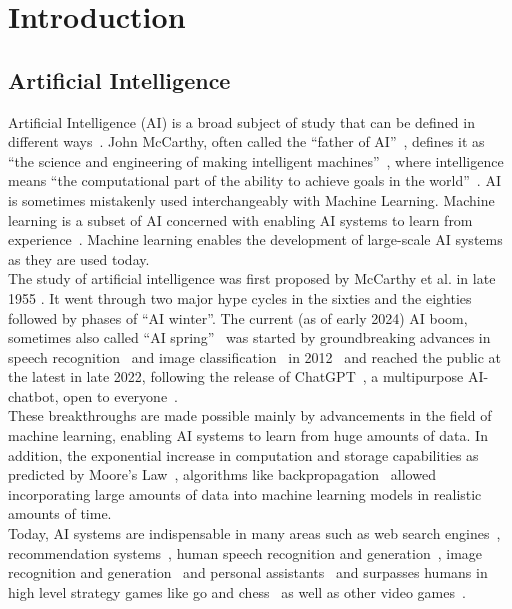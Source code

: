 \graphicspath{{img/intro/out}}


\chapter{Introduction}
\label{ch:intro}

\section{Artificial Intelligence}
\label{sec:artificial-intelligence}
Artificial Intelligence (AI) is a broad subject of study that can be defined in different ways~\cite[chapter 1]{russell_artificial_2021}.
John McCarthy, often called the “father of AI”~\cite{wiki_ai_2023, woo_fatherofai_2014, andresen_fatherofai_2002}, defines it as “the science and engineering of making intelligent machines”~\cite{stanford-whatisai}, where intelligence means “the computational part of the ability to achieve goals in the world”~\cite{stanford-whatisai}.
AI is sometimes mistakenly used interchangeably with Machine Learning.
Machine learning is a subset of AI concerned with enabling AI systems to learn from experience~\cite[chapter 1]{russell_artificial_2021}.
Machine learning enables the development of large-scale AI systems as they are used today.
\\
The study of artificial intelligence was first proposed by McCarthy et al. in late 1955 \cite{mccarthy_proposal_1955}.
It went through two major hype cycles in the sixties and the eighties~\cite{googlengram_ai, wiki_ai_2023, sitnflash_history_2017} followed by phases of “AI winter”.
The current (as of early 2024) AI boom, sometimes also called “AI spring”~\cite{aispring} was started by groundbreaking advances in speech recognition~\cite{hinton_deep_2012} and image classification~\cite{krizhevsky_imagenet_2012} in 2012~\cite{google_decade_2021, house_2012_2019} and reached the public at the latest in late 2022, following the release of ChatGPT~\cite{openai_chatgpt_intro}, a multipurpose AI-chatbot, open to everyone~\cite{openai_chatgpt}.
\\
These breakthroughs are made possible mainly by advancements in the field of machine learning, enabling AI systems to learn from huge amounts of data.
In addition, the exponential increase in computation and storage capabilities as predicted by Moore’s Law~\cite{mooreslaw}, algorithms like backpropagation~\cite{rumelhart_learning_1986} allowed incorporating large amounts of data into machine learning models in realistic amounts of time.
\\
Today, AI systems are indispensable in many areas such as web search engines~\cite{google_howweuseai}, recommendation systems~\cite{burke_recommender_2011}, human speech recognition and generation~\cite{elevenlabs, hinton_deep_2012}, image recognition and generation~\cite{midjourney, krizhevsky_imagenet_2012} and personal assistants~\cite{openai_chatgpt_intro} and surpasses humans in high level strategy games like go and chess~\cite{silver_mastering_2016, silver_mastering_2017} as well as other video games~\cite{piper_ai_2019}.

